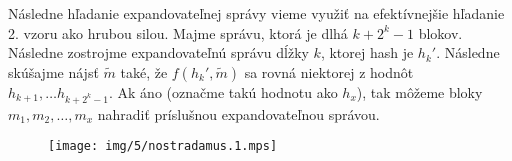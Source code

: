 Následne hľadanie expandovateľnej správy vieme využiť na efektívnejšie hľadanie 2. vzoru ako hrubou silou.
Majme správu, ktorá je dlhá $k + 2^k - 1$ blokov. Následne zostrojme expandovateľnú správu dĺžky $k$, ktorej hash je $h_k'$.
Následne skúšajme nájsť  $\tilde{m}$ také, že $f(h_k', \tilde{m})$ sa rovná niektorej z hodnôt $h_{k+1}, \dots h_{k+2^k-1}$. Ak áno 
(označme takú hodnotu ako $h_x$), tak môžeme bloky $m_1, m_2, \dots, m_x$ nahradiť príslušnou expandovateľnou správou.


\begin{figure}[h]
    \centering
    \texttt{[image: img/5/nostradamus.1.mps]}
\end{figure}
